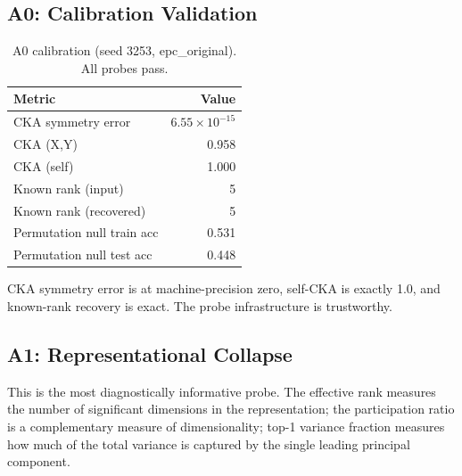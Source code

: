 \documentclass[11pt,a4paper]{article}
\begin{document}
\subsection{A0: Calibration Validation}

\begin{table}[h]
\centering
\begin{tabular}{lr}
\toprule
\textbf{Metric} & \textbf{Value} \\
\midrule
CKA symmetry error & $6.55 \times 10^{-15}$ \\
CKA (X,Y) & 0.958 \\
CKA (self) & 1.000 \\
Known rank (input) & 5 \\
Known rank (recovered) & 5 \\
Permutation null train acc & 0.531 \\
Permutation null test acc & 0.448 \\
\bottomrule
\end{tabular}
\caption{A0 calibration (seed 3253, epc\_original).  All probes pass.}
\label{tab:a0-calibration}
\end{table}

CKA symmetry error is at machine-precision zero, self-CKA is exactly
1.0, and known-rank recovery is exact.  The probe infrastructure is
trustworthy.

\subsection{A1: Representational Collapse}

This is the most diagnostically informative probe.  The effective rank
measures the number of significant dimensions in the representation;
the participation ratio is a complementary measure of dimensionality;
top-1 variance fraction measures how much of the total variance is
captured by the single leading principal component.
\end{document}
